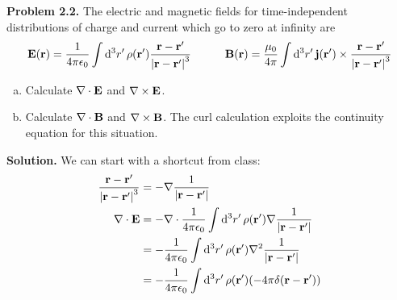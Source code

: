 \documentclass{article}
\begin{document}
\insertTitle




\hrulefill


\textbf{Problem 2.2.} The electric and magnetic fields for time-independent distributions of charge and current which go to zero at infinity are
\[
\begin{aligned}
	\vb{E}(\vb{r}) = \frac{1}{4\pi\epsilon _0}\int\dd[3]{r'}\rho(\vb{r'})\frac{\vb{r}-\vb{r'}}{\left|\vb{r}-\vb{r'}\right|^3} \quad\quad\quad \vb{B}(\vb{r}) = \frac{\mu _0}{4\pi}\int\dd[3]{r'}\vb{j}(\vb{r'})\times\frac{\vb{r}-\vb{r'}}{\left|\vb{r}-\vb{r'}\right|^3}
\end{aligned}
\]

\begin{enumerate}[(a)]
\item Calculate $\nabla\cdot\vb{E}$ and $\nabla\times\vb{E}$.
\item Calculate $\nabla\cdot\vb{B}$ and $\nabla\times\vb{B}$. The curl calculation exploits the continuity equation for this situation.
\end{enumerate}

\textbf{Solution.} We can start with a shortcut from class:
\[
\begin{aligned}
	\frac{\vb{r}-\vb{r'}}{\left|\vb{r}-\vb{r'}\right|^3} &= -\nabla \frac{1}{\left|\vb{r}-\vb{r'}\right|} \\
	\nabla\cdot\vb{E} &= -\nabla\cdot\frac{1}{4\pi\epsilon _0}\int\dd[3]{r'} \rho(\vb{r'})\nabla \frac{1}{\left|\vb{r}-\vb{r'}\right|} \\
	&= -\frac{1}{4\pi\epsilon _0}\int\dd[3]{r'}\rho(\vb{r'})\nabla ^2 \frac{1}{\left|\vb{r}-\vb{r'}\right|} \\
	&= -\frac{1}{4\pi\epsilon _0}\int\dd[3]{r'}\rho(\vb{r'})(-4\pi\delta(\vb{r}-\vb{r'}))
\end{aligned}
\]
\end{document}
